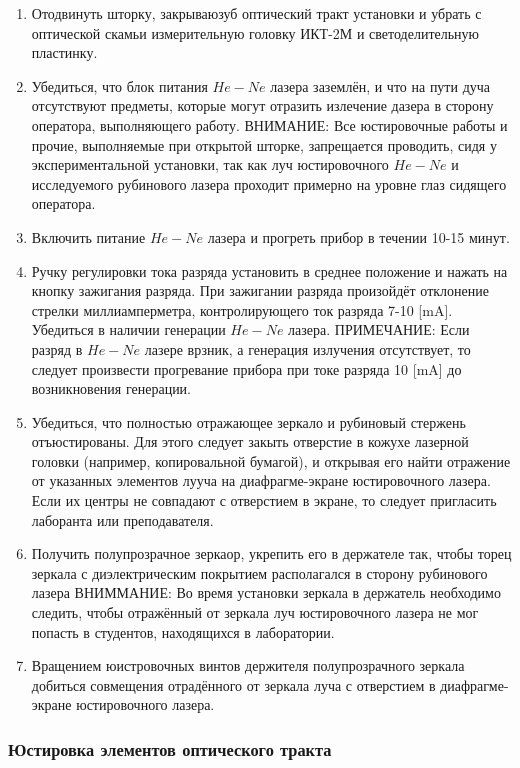 \documentclass[a4paper,14pt,russian]{article}
\begin{document}
\begin{enumerate}
\item Отодвинуть шторку, закрываюзуб оптический тракт установки и убрать с оптической скамьи измерительную головку ИКТ-2М и светоделительную пластинку.
\item Убедиться, что блок питания $He-Ne$ лазера заземлён, и что на пути дуча отсутствуют предметы, которые могут отразить излечение дазера в сторону оператора, выполняющего работу. ВНИМАНИЕ: Все юстировочные работы и прочие, выполняемые при открытой шторке, запрещается проводить, сидя у экспериментальной установки, так как луч юстировочного $He-Ne$ и исследуемого рубинового лазера проходит примерно на уровне глаз сидящего оператора.
\item Включить питание $He-Ne$ лазера и прогреть прибор в течении 10-15 минут.
\item Ручку регулировки тока разряда установить в среднее положение и нажать на кнопку зажигания разряда. При зажигании разряда произойдёт отклонение стрелки миллиамперметра, контролирующего ток разряда 7-10 [mA]. Убедиться в наличии генерации $He-Ne$ лазера. ПРИМЕЧАНИЕ: Если разряд в $He-Ne$ лазере врзник, а генерация излучения отсутствует, то следует произвести прогревание прибора при токе разряда 10 [mA] до возникновения генерации.
\item Убедиться, что полностью отражающее зеркало и рубиновый стержень отъюстированы. Для этого следует закыть отверстие в кожухе лазерной головки (например, копировальной бумагой), и открывая его найти отражение от указанных элементов лууча на диафрагме-экране юстировочного лазера. Если их центры не совпадают с отверстием в экране, то следует пригласить лаборанта или преподавателя.
\item Получить полупрозрачное зеркаор, укрепить его в держателе так, чтобы торец зеркала с диэлектрическим покрытием располагался в сторону рубинового лазера ВНИММАНИЕ: Во время установки зеркала в держатель необходимо следить, чтобы отражённый от зеркала луч юстировочного лазера не мог попасть в студентов, находящихся в лаборатории.
\item Вращением юистровочных винтов держителя полупрозрачного зеркала добиться совмещения отрадённого от зеркала луча с отверстием в диафрагме-экране юстировочного лазера.
\end{enumerate}

\subsubsection{Юстировка элементов оптического тракта}
\end{document}

